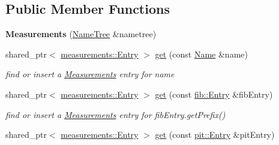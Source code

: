 \subsection*{Public Member Functions}
\begin{DoxyCompactItemize}
\item 
{\bfseries Measurements} (\hyperlink{classnfd_1_1NameTree}{Name\+Tree} \&nametree)\hypertarget{classnfd_1_1Measurements_abefa0b718b1264c96fbcaffcd7154864}{}\label{classnfd_1_1Measurements_abefa0b718b1264c96fbcaffcd7154864}

\item 
shared\+\_\+ptr$<$ \hyperlink{classnfd_1_1measurements_1_1Entry}{measurements\+::\+Entry} $>$ \hyperlink{classnfd_1_1Measurements_a9bad29e5be58ef5b68fbdb8127360782}{get} (const \hyperlink{classndn_1_1Name}{Name} \&name)\hypertarget{classnfd_1_1Measurements_a9bad29e5be58ef5b68fbdb8127360782}{}\label{classnfd_1_1Measurements_a9bad29e5be58ef5b68fbdb8127360782}

\begin{DoxyCompactList}\small\item\em find or insert a \hyperlink{classnfd_1_1Measurements}{Measurements} entry for {\ttfamily name} \end{DoxyCompactList}\item 
shared\+\_\+ptr$<$ \hyperlink{classnfd_1_1measurements_1_1Entry}{measurements\+::\+Entry} $>$ \hyperlink{classnfd_1_1Measurements_a1db47ae06c5bdd6ab96098c63ae144fb}{get} (const \hyperlink{classnfd_1_1fib_1_1Entry}{fib\+::\+Entry} \&fib\+Entry)\hypertarget{classnfd_1_1Measurements_a1db47ae06c5bdd6ab96098c63ae144fb}{}\label{classnfd_1_1Measurements_a1db47ae06c5bdd6ab96098c63ae144fb}

\begin{DoxyCompactList}\small\item\em find or insert a \hyperlink{classnfd_1_1Measurements}{Measurements} entry for {\ttfamily fib\+Entry.\+get\+Prefix()} \end{DoxyCompactList}\item 
shared\+\_\+ptr$<$ \hyperlink{classnfd_1_1measurements_1_1Entry}{measurements\+::\+Entry} $>$ \hyperlink{classnfd_1_1Measurements_a1ee210e05521f5bff5f2465f87598aa6}{get} (const \hyperlink{classnfd_1_1pit_1_1Entry}{pit\+::\+Entry} \&pit\+Entry)\hypertarget{classnfd_1_1Measurements_a1ee210e05521f5bff5f2465f87598aa6}{}\label{classnfd_1_1Measurements_a1ee210e05521f5bff5f2465f87598aa6}


\end{DoxyCompactItemize}
